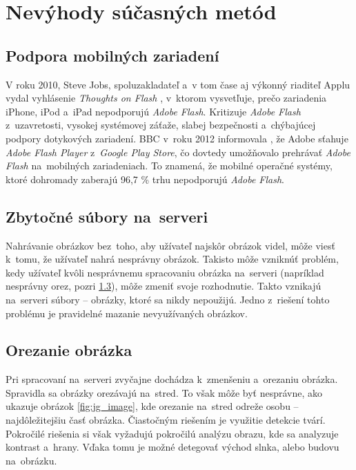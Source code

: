 \graphicspath{ {img/23/} }

\chapter{Nevýhody súčasných metód}
\section{Podpora mobilných zariadení}
\label{sec:mobile-support}

V roku 2010, Steve Jobs, spoluzakladateľ a~v tom čase aj výkonný riaditeľ Applu vydal vyhlásenie \emph{Thoughts on Flash} \cite{Apple_flash}, v~ktorom vysvetľuje, prečo zariadenia iPhone, iPod a~iPad nepodporujú \emph{Adobe Flash}. Kritizuje \emph{Adobe Flash} z~uzavretosti, vysokej systémovej záťaže, slabej bezpečnosti a~chýbajúcej podpory dotykových zariadení.
BBC v~roku 2012 informovala \cite{Android_flash}, že Adobe sťahuje \emph{Adobe Flash Player} z~\emph{Google Play Store}, čo dovtedy umožňovalo prehrávať \emph{Adobe Flash} na~mobilných zariadeniach. To znamená, že mobilné operačné systémy, ktoré dohromady zaberajú 96,7 \% trhu \cite{Mobile_OS_share} nepodporujú \emph{Adobe Flash}.


\section{Zbytočné súbory na~serveri}

Nahrávanie obrázkov bez~toho, aby užívateľ najskôr obrázok videl, môže viesť k~tomu, že užívateľ nahrá nesprávny obrázok. Takisto môže vzniknúť problém, kedy užívateľ kvôli nesprávnemu spracovaniu obrázka na~serveri (napríklad nesprávny orez, pozri \ref{sec:orezanie-obrazka}), môže zmeniť svoje rozhodnutie. Takto vznikajú na~serveri súbory -- obrázky, ktoré sa nikdy nepoužijú. Jedno z~riešení tohto problému je pravidelné mazanie nevyužívaných obrázkov.   

\section{Orezanie obrázka}
\label{sec:orezanie-obrazka}

Pri spracovaní na~serveri zvyčajne dochádza k~zmenšeniu a~orezaniu obrázka. Spravidla sa obrázky orezávajú na~stred. To však môže byť nesprávne, ako ukazuje obrázok \ref{fig:jg_image}, kde orezanie na~stred odreže osobu -- najdôležitejšiu časť obrázka. Čiastočným riešením je využitie detekcie tvárí. Pokročilé riešenia si však vyžadujú pokročilú analýzu obrazu, kde sa analyzuje kontrast a~hrany. Vďaka tomu je možné detegovať východ slnka, alebo budovu na~obrázku. 


